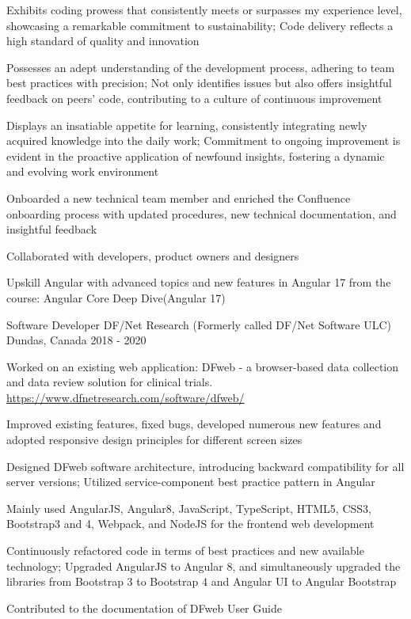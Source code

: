 \begin{cventries}
{\begin{cvitems}
		\item 
		{Exhibits coding prowess that consistently meets or surpasses my experience level, showcasing a remarkable commitment to sustainability; Code delivery reflects a high standard of quality and innovation}
		\item 
		{Possesses an adept understanding of the development process, adhering to team best practices with precision; Not only identifies issues but also offers insightful feedback on peers' code, contributing to a culture of continuous improvement}
		\item 
		{Displays an insatiable appetite for learning, consistently integrating newly acquired knowledge into the daily work; Commitment to ongoing improvement is evident in the proactive application of newfound insights, fostering a dynamic and evolving work environment}
		\item
		{Onboarded a new technical team member and enriched the Confluence onboarding process with updated procedures, new technical documentation, and insightful feedback}
		\item
		{Collaborated with developers, product owners and designers}
		\item
		{Upskill Angular with advanced topics and new features in Angular 17 from the course: Angular Core Deep Dive(Angular 17)}
	\end{cvitems}
}




  \cventry
{Software Developer} %
{DF/Net Research (Formerly called DF/Net Software ULC)} %
{Dundas, Canada} %
{2018 - 2020} %
{Worked on an existing web application: DFweb -  a browser-based data collection and data review solution for clinical trials. \href{https://www.dfnetresearch.com/software/dfweb/}{https://www.dfnetresearch.com/software/dfweb/}
\vspace{6.0mm}
\begin{cvitems}
		\item
		{Improved existing features, fixed bugs, developed numerous new features and adopted responsive design principles for different screen sizes}
		\item
		{Designed DFweb software architecture, introducing backward compatibility for all server versions; Utilized service-component best practice pattern in Angular}
		\item
		{Mainly used AngularJS, Angular8, JavaScript, TypeScript, HTML5, CSS3, Bootstrap3 and 4, Webpack, and NodeJS for the frontend web development}
		\item
		{Continuously refactored code in terms of best practices and new available technology; Upgraded AngularJS to Angular 8, and simultaneously upgraded the libraries from Bootstrap 3 to Bootstrap 4 and Angular UI to Angular Bootstrap }
		\item
		{Contributed to the documentation of DFweb User Guide}
	\end{cvitems}
}


\end{cventries}
